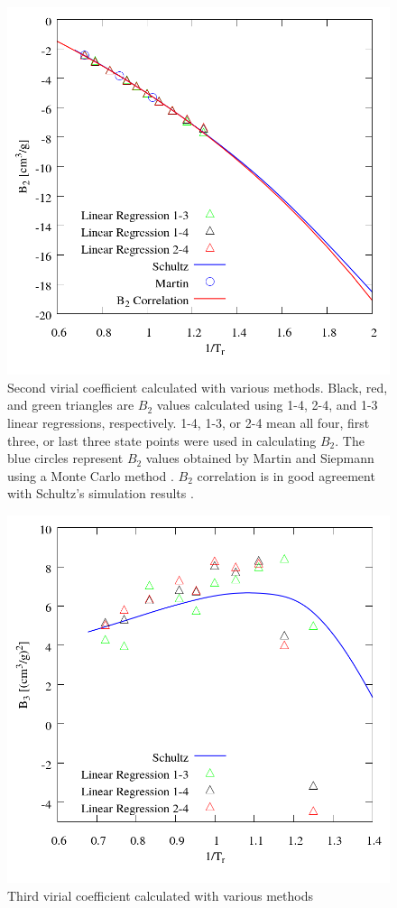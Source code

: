 \documentclass[%
 aip,
 jcp,
 sd,%
 amsmath,amssymb,
 reprint,%
]{revtex4-1}
\begin{document}
\begin{figure}
\includegraphics[scale=0.3]{Figures/TraPPE-C2-B2.png}
\caption{Second virial coefficient calculated with various methods. Black, red, and green triangles are $B_2$ values calculated using 1-4, 2-4, and 1-3 linear regressions, respectively. 1-4, 1-3, or 2-4 mean all four, first three, or last three state points were used in calculating $B_2$. The blue circles represent $B_2$ values obtained by Martin and Siepmann \cite{Martin1998} using a Monte Carlo method \cite{Harismiadis1994}. $B_2$ correlation is in good agreement with Schultz's simulation results \cite{Schultz2010a}.}
\label{fig:TraPPE-C2-B2}
\end{figure}

\begin{figure}
\includegraphics[scale=0.3]{Figures/TraPPE-C2-B3.png}
\caption{Third virial coefficient calculated with various methods}
\label{fig:TraPPE-C2-B3}
\end{figure}
\end{document}

